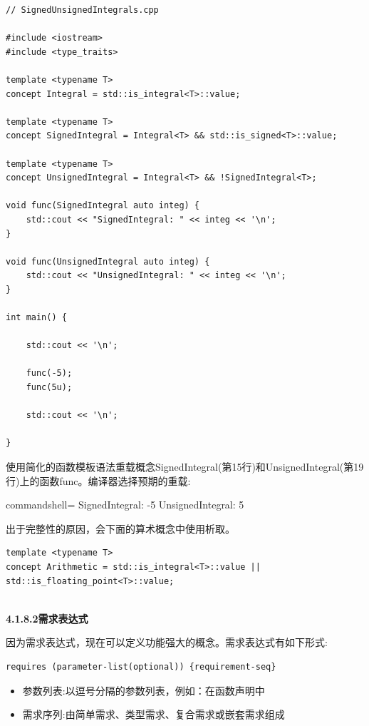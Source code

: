 \begin{lstlisting}[style=styleCXX]
// SignedUnsignedIntegrals.cpp

#include <iostream>
#include <type_traits>

template <typename T>
concept Integral = std::is_integral<T>::value;

template <typename T>
concept SignedIntegral = Integral<T> && std::is_signed<T>::value;

template <typename T>
concept UnsignedIntegral = Integral<T> && !SignedIntegral<T>;

void func(SignedIntegral auto integ) {
	std::cout << "SignedIntegral: " << integ << '\n';
}

void func(UnsignedIntegral auto integ) {
	std::cout << "UnsignedIntegral: " << integ << '\n';
}

int main() {

	std::cout << '\n';

	func(-5);
	func(5u);

	std::cout << '\n';

}
\end{lstlisting}

使用简化的函数模板语法重载概念SignedIntegral(第15行)和UnsignedIntegral(第19行)上的函数func。编译器选择预期的重载:

\begin{tcblisting}{commandshell={}}
SignedIntegral: -5
UnsignedIntegral: 5
\end{tcblisting}

出于完整性的原因，会下面的算术概念中使用析取。

\begin{lstlisting}[style=styleCXX]
template <typename T>
concept Arithmetic = std::is_integral<T>::value || std::is_floating_point<T>::value;
\end{lstlisting}

\hspace*{\fill} \\ %
\noindent
\textbf{4.1.8.2\hspace{0.2cm}需求表达式}

因为需求表达式，现在可以定义功能强大的概念。需求表达式有如下形式:

\begin{lstlisting}[style=styleCXX]
requires (parameter-list(optional)) {requirement-seq}
\end{lstlisting}

\begin{itemize}
\item
参数列表:以逗号分隔的参数列表，例如：在函数声明中

\item
需求序列:由简单需求、类型需求、复合需求或嵌套需求组成
\end{itemize}

